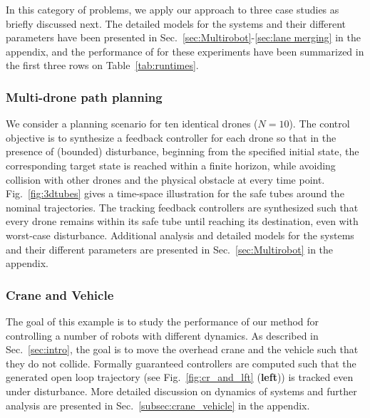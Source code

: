 In this category of problems, we apply our approach to three case studies as briefly discussed next. 
The detailed models for the systems and their different parameters have been presented in Sec.~\ref{sec:Multirobot}-\ref{sec:lane merging} in the appendix, and the performance of \tool for these experiments have been summarized in the first three rows on Table~\ref{tab:runtimes}.

\subsubsection{Multi-drone path planning}\label{subsec:Multirobot}
We consider a planning scenario for ten identical drones ($N=10$). 
The control objective is to synthesize a feedback controller for each drone so that in the presence of (bounded) disturbance, beginning from the specified initial state, the corresponding target state is reached within a finite horizon, 
while avoiding collision with other drones and the physical obstacle at every time point. 
Fig.~\ref{fig:3dtubes} gives a time-space illustration for the safe tubes around the nominal trajectories. 
The tracking feedback controllers are synthesized such that every drone remains within its safe tube until reaching its destination, 
even with worst-case disturbance.  
Additional analysis and detailed models for the systems and their different parameters are presented in Sec.~\ref{sec:Multirobot} in the appendix.

\subsubsection{Crane and Vehicle}
The goal of this example is to study the performance of our method for 
controlling a number of robots with different dynamics. 
As described in Sec.~\ref{sec:intro}, the goal is to move the overhead crane
and the vehicle such that they do not collide.
Formally guaranteed controllers are computed such that the generated open loop trajectory 
(see Fig.~\ref{fig:cr_and_lft} (\textbf{left})) is tracked even under disturbance. 
More detailed discussion on dynamics of systems and further analysis are presented in Sec.~\ref{subsec:crane_vehicle} in the appendix.

